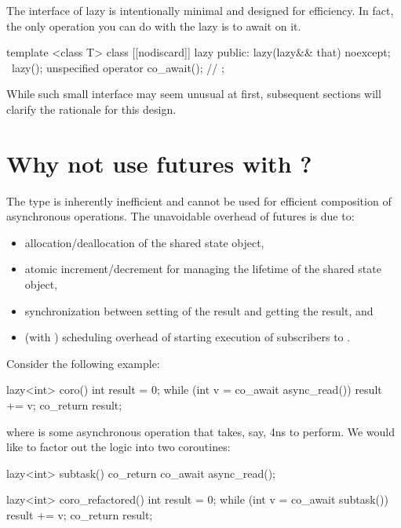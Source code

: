 The interface of lazy is intentionally minimal and designed for efficiency. In fact, the only operation you can do with the lazy is to await on it.

\begin{codeblock}
template <class T>
class [[nodiscard]] lazy {
public:
  lazy(lazy&& that) noexcept;
  ~lazy();
  unspecified operator co_await(); // \expos
};
\end{codeblock}

While such small interface may seem unusual at first, subsequent sections will clarify the rationale for this design.

\section{Why not use futures with ?}

The  type is inherently inefficient and cannot be used for efficient composition of asynchronous operations.
The unavoidable overhead of futures is due to:
\begin{itemize}
\item allocation/deallocation of the shared state object,
\item atomic increment/decrement for managing the lifetime of the shared state object,
\item synchronization between setting of the result and getting the result, and
\item (with ) scheduling overhead of starting execution of subscribers to .
\end{itemize}

Consider the following example:
\begin{codeblock}
lazy<int> coro() {
  int result = 0;
  while (int v = co_await async_read())
    result += v;
  co_return result;
}
\end{codeblock}
where  is some asynchronous operation that takes, say, 4ns to perform.
We would like to factor out the logic into two coroutines:
\begin{codeblock}
lazy<int> subtask() {
  co_return co_await async_read();
}

lazy<int> coro_refactored() {
  int result = 0;
  while (int v = co_await subtask())
    result += v;
  co_return result;
}
\end{codeblock}

